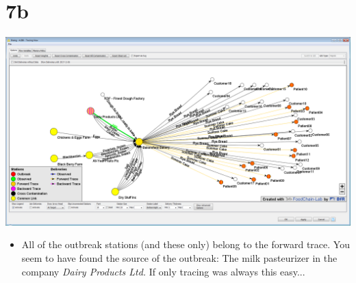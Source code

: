 \documentclass[10pt]{beamer}
\begin{document}
\section{7b}
\begin{frame}
	\begin{center}
			\includegraphics[height=0.6\textheight]{7b.png}
	\end{center}
	\begin{itemize}
		\item All of the outbreak stations (and these only) belong to the forward trace. You seem to have found the source of the outbreak: The milk pasteurizer in the company \textit{Dairy Products Ltd.} If only tracing was always this easy...
	\end{itemize}
	\end{frame}
\end{document}
